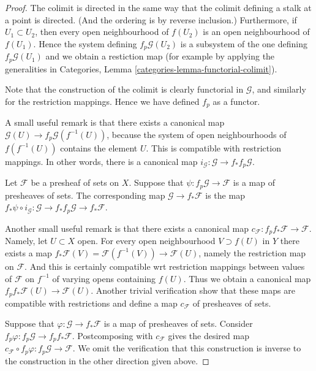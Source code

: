 \begin{proof}
The colimit is directed in the same way that the colimit
defining a stalk at a point is directed. (And the
ordering is by reverse inclusion.) Furthermore, if
$U_1 \subset U_2$, then every open neighbourhood of $f(U_2)$
is an open neighbourhood of $f(U_1)$. Hence the system defining
$f_p\mathcal{G}(U_2)$ is a subsystem of the one defining
$f_p\mathcal{G}(U_1)$ and we obtain a restiction map (for
example by applying the generalities in Categories,
Lemma \ref{categories-lemma-functorial-colimit}).

\medskip\noindent
Note that the construction of the colimit is clearly functorial
in $\mathcal{G}$, and similarly for the restriction mappings.
Hence we have defined $f_p$ as a functor.

\medskip\noindent
A small useful remark is that there exists
a canonical map $\mathcal{G}(U) \to f_p\mathcal{G}(f^{-1}(U))$,
because the system of open neighbourhoods
of $f(f^{-1}(U))$ contains the element $U$. This is compatible
with restriction mappings. In other words, there is a
canonical map $i_{\mathcal{G}} : \mathcal{G} \to f_* f_p \mathcal{G}$.

\medskip\noindent
Let $\mathcal{F}$ be a presheaf of sets on $X$.
Suppose that $\psi : f_p\mathcal{G} \to \mathcal{F}$
is a map of presheaves of sets. The corresponding map
$\mathcal{G} \to f_*\mathcal{F}$ is the map
$f_*\psi \circ i_{\mathcal{G}} :
\mathcal{G} \to f_* f_p \mathcal{G} \to f_* \mathcal{F}$.

\medskip\noindent
Another small useful remark is that there exists a
canonical map $c_{\mathcal{F}} : f_p f_* \mathcal{F} \to \mathcal{F}$.
Namely, let $U \subset X$ open.
For every open neighbourhood $V \supset f(U)$ in $Y$
there exists a map
$f_*\mathcal{F}(V) = \mathcal{F}(f^{-1}(V))\to \mathcal{F}(U)$,
namely the restriction map on $\mathcal{F}$. And this is certainly
compatible wrt restriction mappings between values of $\mathcal{F}$
on $f^{-1}$ of varying opens containing $f(U)$. Thus we obtain
a canonical map $f_p f_* \mathcal{F}(U) \to \mathcal{F}(U)$.
Another trivial verification show that these maps are compatible
with restrictions and define a map $c_{\mathcal{F}}$
of presheaves of sets.

\medskip\noindent
Suppose that $\varphi : \mathcal{G} \to f_*\mathcal{F}$
is a map of presheaves of sets. Consider $f_p\varphi :
f_p \mathcal{G} \to f_p f_* \mathcal{F}$.
Postcomposing with $c_{\mathcal{F}}$ gives the desired map
$c_{\mathcal{F}} \circ f_p\varphi : f_p\mathcal{G} \to \mathcal{F}$.
We omit the verification that this construction is inverse
to the construction in the other direction given above.
\end{proof}

